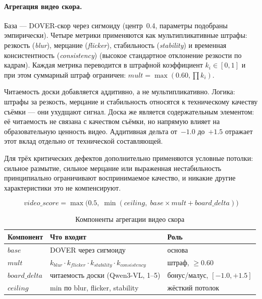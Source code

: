 \paragraph{Агрегация видео скора.}

База — DOVER-скор через сигмоиду (центр~0.4, параметры подобраны эмпирически).
Четыре метрики применяются как мультипликативные штрафы:
резкость (\textit{blur}), мерцание (\textit{flicker}), стабильность (\textit{stability}) и временная консистентность (\textit{consistency})
(высокое стандартное отклонение резкости по кадрам). Каждая метрика переводится в штрафной коэффициент $k_i\in[0,1]$
и при этом суммарный штраф ограничен: $\textit{mult} = \max(0.60, \prod k_i)$.

Читаемость доски добавляется аддитивно, а не мультипликативно.
Логика: штрафы за резкость, мерцание и стабильность относятся к
техническому качеству съёмки — они ухудщают сигнал.
Доска же является содержательным элементом: её читаемость не связана
с качеством съёмки, но напрямую влияет на образовательную ценность видео.
Аддитивная дельта от~$-1.0$ до~$+1.5$ отражает этот вклад отдельно
от технической составляющей.

Для трёх критических дефектов дополнительно применяются условные потолки:
сильное размытие, сильное мерцание или выраженная нестабильность принципиально ограничивают
воспринимаемое качество, и никакие другие характеристики это не компенсируют.

\begin{equation}
\textit{video\_score} = \max\!\bigl(0.5,\;
    \min(\textit{ceiling},\;
    \textit{base} \times \textit{mult} + \textit{board\_delta})\bigr)
\end{equation}

\begin{table}[h]
\centering
\small
\begin{tabular}{lll}
\toprule
\textbf{Компонент} & \textbf{Что входит} & \textbf{Роль} \\
\midrule
$\textit{base}$ & DOVER через сигмоиду & основа \\
$\textit{mult}$ & $k_{\textit{blur}} \cdot k_{\textit{flicker}} \cdot k_{\textit{stability}} \cdot k_{\textit{consistency}}$ & штраф, $\geq 0.60$ \\
$\textit{board\_delta}$ & читаемость доски (Qwen3-VL, 1–5) & бонус/малус, $[-1.0, +1.5]$ \\
$\textit{ceiling}$ & min по blur, flicker, stability & жёсткий потолок \\
\bottomrule
\end{tabular}
\caption{Компоненты агрегации видео скора}
\end{table}

